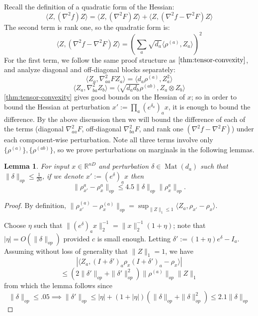 \documentclass[aos]{imsart}
\newtheorem{lemma}[theorem]{Lemma}
\theoremstyle{definition}
\numberwithin{equation}{section}
\DeclareMathOperator{\mat}{Mat}
\newcommand{\R}{{\mathbb{R}}}
\newcommand{\samp}{x}
\begin{document}
\begin{appendix}
Recall the definition of a quadratic form of the Hessian:
\[ \langle Z, (\nabla^{2} f) Z \rangle = \langle Z, (\nabla^{2} F) Z \rangle + \langle Z, (\nabla^{2} f - \nabla^{2} F) Z \rangle     \]
The second term is rank one, so the quadratic form is:
\[ \langle Z, (\nabla^{2} f - \nabla^{2} F) Z \rangle = \left( \sum_{a} \sqrt{d_{a}} \langle \rho^{(a)}, Z_{a} \rangle   \right)^{2}       \]
For the first term, we follow the same proof structure as $\cref{thm:tensor-convexity}$, and analyze diagonal and off-diagonal blocks separately:
\[ \langle Z_{a}, \nabla^{2}_{aa} F Z_{a} \rangle = \langle d_{a} \rho^{(a)}, Z_{a}^{2} \rangle       \]
\[ \langle Z_{a}, \nabla^{2}_{ba} Z_{b} \rangle = \langle \sqrt{d_{a} d_{b}} \rho^{(ab)}, Z_{a} \otimes Z_{b} \rangle   \]
\cref{thm:tensor-convexity} gives good bounds on the Hessian of $\samp$; so in order to bound the Hessian at perturbation $\samp' := \prod_{a} (e^{\delta_{a}})_{a} \samp$, it is enough to bound the difference. By the above discussion then we will bound the difference of each of the terms (diagonal $\nabla^{2}_{aa} F$, off-diagonal $\nabla^{2}_{ba} F$, and rank one $(\nabla^{2} f - \nabla^{2} F)$) under each component-wise perturbation. Note all three terms involve only $\{\rho^{(a)}\}, \{\rho^{(ab)}\}$, so we prove perturbations on marginals in the following lemmas.

\begin{lemma} \label{atoaaRobustness}
For input $\samp \in \R^{nD}$ and perturbation $\delta \in \mat(d_{a})$ such that $\|\delta\|_{op} \leq \frac{1}{20}$, if we denote $\samp' := (e^{\delta})_{a} \samp$ then
\[ \|\rho_{\samp'}^{a} - \rho_{\samp}^{a}\|_{op} \leq 4.5 \|\delta\|_{op} \|\rho_{\samp}^{a}\|_{op}   . \]
\end{lemma}
\begin{proof} By definition, $\|\rho_{\samp'}^{(a)} - \rho_{\samp}^{(a)}\|_{op} = \sup_{\|Z\|_{1} \leq 1} \langle Z_{a}, \rho_{\samp'} - \rho_{\samp} \rangle $.


Choose $\eta$ such that  $\|(e^{\delta})_{a} \samp\|_{2}^{-1} = \|\samp\|_{2}^{-1} (1 + \eta)$; note that $|\eta| = O(\|\delta\|_{op})$ provided $c$ is small enough. Letting $\delta' := (1+\eta)e^{\delta} - I_{a}$. Assuming without loss of generality that $\|Z\|_{1} = 1$, we have
\[ | \langle Z_{a}, (I+\delta')_a \rho_{\samp} (I+\delta')_a - \rho_{\samp} \rangle | \]
\[ \leq (2\|\delta'\|_{op} + \|\delta'\|_{op}^{2}) \|\rho^{(a)}\|_{op} \|Z\|_{1}    \]
from which the lemma follows since
\[ \|\delta\|_{op} \leq .05 \implies \|\delta'\|_{op} \leq |\eta| + (1+|\eta|)(\|\delta\|_{op} + \|\delta\|_{op}^{2}) \leq  2.1 \|\delta\|_{op} \]
\end{proof}


\end{appendix}
\end{document}
